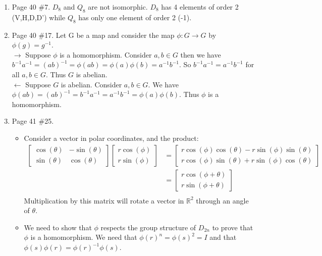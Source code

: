 \documentclass[12pt]{report}
\begin{document}
\begin{enumerate}
\item Page 40 \#7. $D_8$ and $Q_8$ are not isomorphic. $D_8$ has 4 elements of
      order 2 (V,H,D,D') while $Q_8$ has only one element of order 2 (-1).\\

\item Page 40 \#17. Let G be a map and consider the map $\phi:G \to G$ by
      $\phi(g) = g^{-1}$.\\

      $\rightarrow$ Suppose $\phi$ is a homomorphism. Consider $a,b \in G$
      then we have $b^{-1}a^{-1} = (ab)^{-1} = \phi(ab) = \phi(a)\phi(b) =
      a^{-1}b^{-1}$. So $b^{-1}a^{-1} = a^{-1}b^{-1}$ for all $a,b \in G$. Thus
      $G$ is abelian.\\

      $\leftarrow$ Suppose $G$ is abelian. Consider $a,b \in G$. We have
      $\phi(ab) = (ab)^{-1} = b^{-1}a^{-1} = a^{-1}b^{-1} = \phi(a)\phi(b)$.
      Thus $\phi$ is a homomorphism.

\item Page 41 \#25.
  \begin{itemize}
  \item Consider a vector in polar coordinates, and the product:
  \begin{align}
    \begin{bmatrix}
      \cos(\theta) & -\sin(\theta)\\
      \sin(\theta) & \cos(\theta)
    \end{bmatrix}
    \begin{bmatrix}
      r\cos(\phi)\\
      r\sin(\phi)
    \end{bmatrix}
    &= \begin{bmatrix}
      r\cos(\phi)\cos(\theta) - r\sin(\phi)\sin(\theta)\\
      r\cos(\phi)\sin(\theta) + r\sin(\phi)\cos(\theta)
    \end{bmatrix}\\
    &=\begin{bmatrix}
      r\cos(\phi+\theta)\\
      r\sin(\phi+\theta)
    \end{bmatrix}\\
  \end{align}
  Multiplication by this matrix will rotate a vector in $\mathbb{R}^2$ through
  an angle of $\theta$.

  \item We need to show that $\phi$ respects the group structure of $D_{2n}$ to
        prove that $\phi$ is a homomorphism. We need that $\phi(r)^n = \phi(s)^2
        = I$ and that $\phi(s)\phi(r) = \phi(r)^{-1}\phi(s)$.


\end{itemize}
\end{enumerate}
\end{document}
